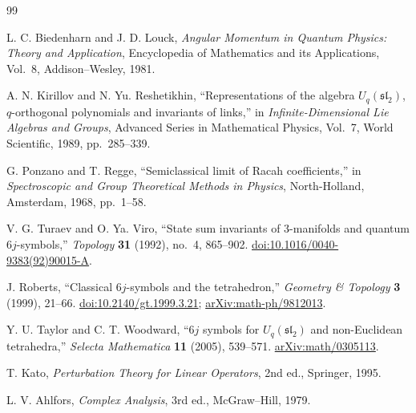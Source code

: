 \begin{thebibliography}{99}

L. C. Biedenharn and J. D. Louck,
\emph{Angular Momentum in Quantum Physics: Theory and Application},
Encyclopedia of Mathematics and its Applications, Vol.~8,
Addison--Wesley, 1981.

A. N. Kirillov and N. Yu. Reshetikhin,
``Representations of the algebra $U_q(\mathfrak{sl}_2)$, $q$-orthogonal polynomials and invariants of links,''
in \emph{Infinite-Dimensional Lie Algebras and Groups},
Advanced Series in Mathematical Physics, Vol.~7,
World Scientific, 1989, pp.~285--339.

G. Ponzano and T. Regge,
``Semiclassical limit of Racah coefficients,''
in \emph{Spectroscopic and Group Theoretical Methods in Physics},
North-Holland, Amsterdam, 1968, pp.~1--58.

V. G. Turaev and O. Ya. Viro,
``State sum invariants of 3-manifolds and quantum $6j$-symbols,''
\emph{Topology} \textbf{31} (1992), no.~4, 865--902.
\href{https://doi.org/10.1016/0040-9383(92)90015-A}{doi:10.1016/0040-9383(92)90015-A}.

J. Roberts,
``Classical $6j$-symbols and the tetrahedron,''
\emph{Geometry \& Topology} \textbf{3} (1999), 21--66.
\href{https://doi.org/10.2140/gt.1999.3.21}{doi:10.2140/gt.1999.3.21};
\href{https://arxiv.org/abs/math-ph/9812013}{arXiv:math-ph/9812013}.

Y. U. Taylor and C. T. Woodward,
``$6j$ symbols for $U_q(\mathfrak{sl}_2)$ and non-Euclidean tetrahedra,''
\emph{Selecta Mathematica} \textbf{11} (2005), 539--571.
\href{https://arxiv.org/abs/math/0305113}{arXiv:math/0305113}.

T. Kato,
\emph{Perturbation Theory for Linear Operators}, 2nd ed.,
Springer, 1995.

L. V. Ahlfors,
\emph{Complex Analysis}, 3rd ed.,
McGraw--Hill, 1979.

\end{thebibliography}
